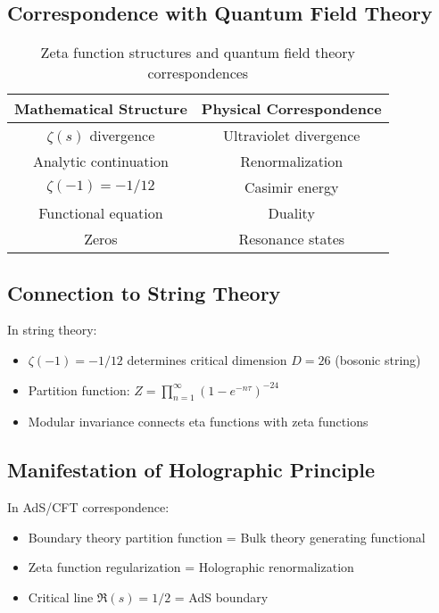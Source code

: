 \documentclass[11pt]{article}
\begin{document}
\subsection{Correspondence with Quantum Field Theory}

\begin{table}[h]
\centering
\begin{tabular}{|c|c|}
\hline
Mathematical Structure & Physical Correspondence \\
\hline
$\zeta(s)$ divergence & Ultraviolet divergence \\
Analytic continuation & Renormalization \\
$\zeta(-1) = -1/12$ & Casimir energy \\
Functional equation & Duality \\
Zeros & Resonance states \\
\hline
\end{tabular}
\caption{Zeta function structures and quantum field theory correspondences}
\end{table}

\subsection{Connection to String Theory}

In string theory:
\begin{itemize}
\item $\zeta(-1) = -1/12$ determines critical dimension $D = 26$ (bosonic string)
\item Partition function: $Z = \prod_{n=1}^{\infty} (1 - e^{-n\tau})^{-24}$
\item Modular invariance connects eta functions with zeta functions
\end{itemize}

\subsection{Manifestation of Holographic Principle}

In AdS/CFT correspondence:
\begin{itemize}
\item Boundary theory partition function = Bulk theory generating functional
\item Zeta function regularization = Holographic renormalization
\item Critical line $\Re(s) = 1/2$ = AdS boundary
\end{itemize}
\end{document}
